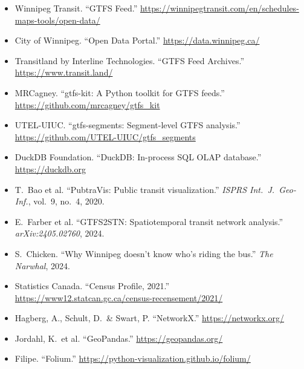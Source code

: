 \documentclass[11pt]{article}
\begin{document}
\begin{itemize}[leftmargin=*]
    \item Winnipeg Transit. ``GTFS Feed.'' \url{https://winnipegtransit.com/en/schedules-maps-tools/open-data/}
    \item City of Winnipeg. ``Open Data Portal.'' \url{https://data.winnipeg.ca/}
    \item Transitland by Interline Technologies. ``GTFS Feed Archives.'' \url{https://www.transit.land/}
    \item MRCagney. ``gtfs-kit: A Python toolkit for GTFS feeds.'' \url{https://github.com/mrcagney/gtfs_kit}
    \item UTEL-UIUC. ``gtfs-segments: Segment-level GTFS analysis.'' \url{https://github.com/UTEL-UIUC/gtfs_segments}
    \item DuckDB Foundation. ``DuckDB: In-process SQL OLAP database.'' \url{https://duckdb.org}
    \item T.\ Bao et al. ``PubtraVis: Public transit visualization.'' \textit{ISPRS Int.\ J.\ Geo-Inf.}, vol.\ 9, no.\ 4, 2020.
    \item E.\ Farber et al. ``GTFS2STN: Spatiotemporal transit network analysis.'' \textit{arXiv:2405.02760}, 2024.
    \item S.\ Chicken. ``Why Winnipeg doesn't know who's riding the bus.'' \textit{The Narwhal}, 2024.
    \item Statistics Canada. ``Census Profile, 2021.'' \url{https://www12.statcan.gc.ca/census-recensement/2021/}
    \item Hagberg, A., Schult, D.\ \& Swart, P. ``NetworkX.'' \url{https://networkx.org/}
    \item Jordahl, K.\ et al. ``GeoPandas.'' \url{https://geopandas.org/}
    \item Filipe. ``Folium.'' \url{https://python-visualization.github.io/folium/}
\end{itemize}
\end{document}

